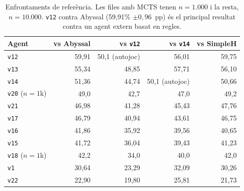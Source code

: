 \begin{table}[htbp]
\centering
\caption{Enfrontaments de referència. Les files amb MCTS tenen $n=1.000$ i la resta, $n=10.000$. \texttt{v12} contra Abyssal (59,91\% $\pm 0,96$~pp) és el principal resultat contra un agent extern basat en regles.}
\label{tab:vs_disc}
\small
\begin{tabular}{lrrrr}
\toprule
\textbf{Agent} & \textbf{vs Abyssal} & \textbf{vs \texttt{v12}} & \textbf{vs \texttt{v14}} & \textbf{vs SimpleH} \\
\midrule
\texttt{v12} & 59,91 & 50,1 (autojoc) & 56,01 & 59,75 \\
\texttt{v13} & 55,34 & 48,85 & 57,71 & 56,10 \\
\texttt{v14} & 51,36 & 44,74 & 50,1 (autojoc) & 50,66 \\
\texttt{v20} ($n=1$k) & 49,0 & 42,7 & 47,0 & 49,2 \\
\texttt{v21} & 46,98 & 41,28 & 45,43 & 47,76 \\
\texttt{v17} & 46,79 & 40,94 & 43,61 & 46,75 \\
\texttt{v16} & 41,86 & 35,92 & 39,56 & 40,65 \\
\texttt{v15} & 41,72 & 36,04 & 39,43 & 41,23 \\
\texttt{v18} ($n=1$k) & 42,2 & 34,0 & 40,0 & 42,0 \\
\texttt{v1}  & 30,64 & 23,29 & 32,09 & 30,26 \\
\texttt{v22} & 22,90 & 19,80 & 25,81 & 21,73 \\
\bottomrule
\end{tabular}
\end{table}
